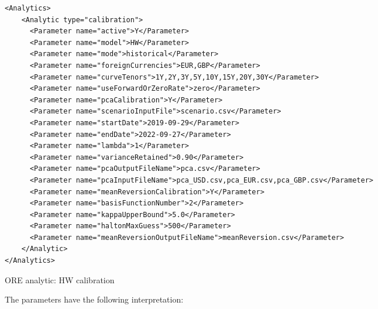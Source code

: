 \begin{listing}[H]
\begin{verbatim}
<Analytics>
    <Analytic type="calibration">
      <Parameter name="active">Y</Parameter>
	  <Parameter name="model">HW</Parameter>
	  <Parameter name="mode">historical</Parameter>
	  <Parameter name="foreignCurrencies">EUR,GBP</Parameter>
	  <Parameter name="curveTenors">1Y,2Y,3Y,5Y,10Y,15Y,20Y,30Y</Parameter>
	  <Parameter name="useForwardOrZeroRate">zero</Parameter>
	  <Parameter name="pcaCalibration">Y</Parameter>
      <Parameter name="scenarioInputFile">scenario.csv</Parameter>
	  <Parameter name="startDate">2019-09-29</Parameter>
	  <Parameter name="endDate">2022-09-27</Parameter>
	  <Parameter name="lambda">1</Parameter>
	  <Parameter name="varianceRetained">0.90</Parameter>
	  <Parameter name="pcaOutputFileName">pca.csv</Parameter>
	  <Parameter name="pcaInputFileName">pca_USD.csv,pca_EUR.csv,pca_GBP.csv</Parameter>
	  <Parameter name="meanReversionCalibration">Y</Parameter>
	  <Parameter name="basisFunctionNumber">2</Parameter>
	  <Parameter name="kappaUpperBound">5.0</Parameter>
	  <Parameter name="haltonMaxGuess">500</Parameter>
	  <Parameter name="meanReversionOutputFileName">meanReversion.csv</Parameter>
    </Analytic>
</Analytics>
\end{verbatim}
\caption{ORE analytic: HW calibration}
\label{lst:ore_calibration_HW}
\end{listing}
The parameters have the following interpretation:

